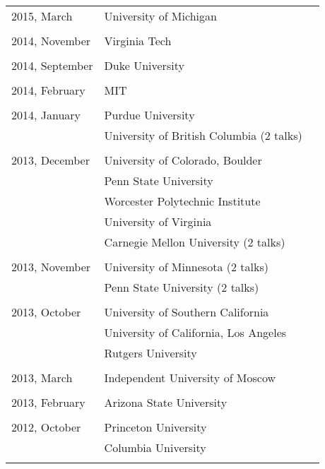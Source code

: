 \documentclass[letterpaper,11pt]{article}
\begin{document}
\begin{longtable}{llc}
  2015, March
  & University of Michigan
  \\\\

  2014, November
  & Virginia Tech\\\\

  2014, September
  & Duke University\\\\

  2014, February
  & MIT\\\\

  2014, January 
  & Purdue University &\hspace{110pt}
  \\& University of British Columbia (2 talks)\\\\
  
  2013, December
  & University of Colorado, Boulder
  \\&Penn State University\\&Worcester Polytechnic Institute
  \\&University of Virginia\\&
  Carnegie Mellon University (2 talks)\\\\
  
  2013, November&
  University of Minnesota (2 talks)\\&
  Penn State University (2 talks)\\\\

  2013, October&
  University of Southern California 
  \\&
  University of California, Los Angeles
  \\&Rutgers University\\\\
  
  2013, March& Independent University of Moscow\\\\

  2013, February & Arizona State University\\\\

  2012, October & Princeton University \\
  & Columbia University\\\\


\end{longtable}
\end{document}
